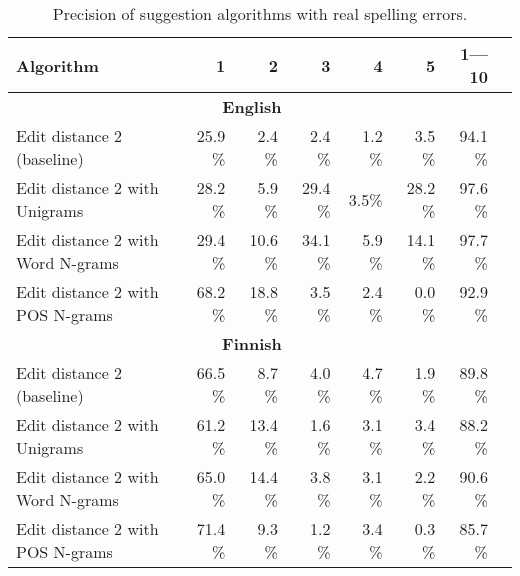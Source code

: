 \documentclass[postprint]{flammie}
\begin{document}
\begin{table*}
    \caption{Precision of suggestion algorithms with real spelling errors.
    \label{table:real-eval}}
  \begin{center}
      \begin{tabular}{lrrrrrrr}
        \hline
        Algorithm & 1 & 2 & 3 & 4 & 5 & 1---10 \\
        \hline
        \multicolumn{7}{c}{\textbf{English}} \\
        \hline
        Edit distance 2 (baseline) 
& 25.9 \% & 2.4 \% & 2.4 \% & 1.2 \% & 3.5 \% & 94.1 \% \\
        \hline
        Edit distance 2 with Unigrams 
& 28.2 \% & 5.9 \% & 29.4 \% & 3.5\% & 28.2 \% & 97.6 \% \\
        \hline
        Edit distance 2 with Word N-grams 
& 29.4 \% & 10.6 \% & 34.1 \% & 5.9 \% & 14.1 \% & 97.7 \% \\
        \hline
        Edit distance 2 with POS N-grams 
& 68.2 \% & 18.8 \% & 3.5 \% & 2.4 \% & 0.0 \% & 92.9 \% \\
\hline
        \multicolumn{7}{c}{\textbf{Finnish}} \\
        \hline
        Edit distance 2 (baseline)
& 66.5 \% & 8.7 \% & 4.0 \% & 4.7 \% & 1.9 \% & 89.8 \% \\
        \hline
        Edit distance 2 with Unigrams 
& 61.2 \% & 13.4 \% & 1.6 \% & 3.1 \% & 3.4 \% & 88.2 \% \\
        \hline
        Edit distance 2 with Word N-grams
& 65.0 \% & 14.4 \% & 3.8 \% & 3.1 \% & 2.2 \% & 90.6 \% \\
        \hline
        Edit distance 2 with POS N-grams
& 71.4 \% & 9.3 \% & 1.2 \% & 3.4 \% & 0.3 \% & 85.7 \% \\
        \hline
      \end{tabular}
  \end{center}
\end{table*}
\end{document}
